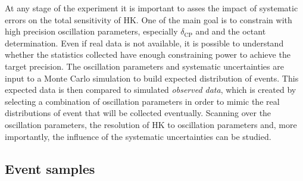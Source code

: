 At any stage of the experiment it is important to asses the impact of systematic errors on the total sensitivity of HK.
One of the main goal is to constrain with high precision oscillation parameters, especially $\delta_\text{CP}$ and %
and the octant determination.
Even if real data is not available, it is possible to understand whether the statistics collected have %
enough constraining power to achieve the target precision.
The oscillation parameters and systematic uncertainties are input to a Monte Carlo simulation %
to build expected distribution of events.
This expected data is then compared to simulated \emph{observed data}, which is created by selecting %
a combination of oscillation parameters in order to mimic the real distributions of event that will be collected eventually.
Scanning over the oscillation parameters, the resolution of HK to oscillation parameters and, more importantly, %
the influence of the systematic uncertainties can be studied.

\subsection{Event samples}

